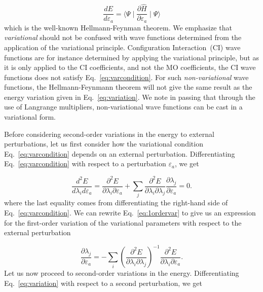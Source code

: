 \documentclass[%
 reprint,
 amsmath,amssymb,
 aps,
]{revtex4-1}
\begin{document}
\begin{equation}
\frac{dE}{d\varepsilon_a} = \langle\Psi\mid\frac{\partial
  \hat{H}}{\partial \varepsilon_a}\mid\Psi\rangle
\end{equation}
which is the well-known Hellmann-Feynman theorem. We emphasize that {\em
variational\/} should not be confused with wave functions determined from the
application of the variational principle. Configuration Interaction~(CI) wave
functions are for instance determined by applying the variational principle,
but as it is only applied to the CI coefficients, and not the MO coefficients,
the CI wave functions does not satisfy Eq.~\eqref{eq:varcondition}. For such
{\em non-variational} wave functions, the Hellmann-Feynmann theorem will not
give the same result as the energy variation given in Eq.~\eqref{eq:variation}.
We note in passing that through the use of Langrange multipliers,
non-variational wave functions can be cast in a variational
form.~\cite{HelgakerJorgensen,PRSBook}

Before considering second-order variations in the energy to external
perturbations, let us first consider how the variational condition
Eq.~\eqref{eq:varcondition} depends on an external perturbation.
Differentiating Eq.~\eqref{eq:varcondition} with respect to a perturbation
$\varepsilon_a$, we get

\begin{equation}
\frac{d^2E}{d\lambda_id\varepsilon_a} =
\frac{\partial^2E}{\partial\lambda_i\partial\varepsilon_a} +
\sum_j\frac{\partial^2E}{\partial\lambda_i\partial\lambda_j}\frac{\partial\lambda_j}{\partial\varepsilon_a}
= 0.\label{eq:1ordervar}
\end{equation}
where the last equality comes from differentiating the right-hand side of
Eq.~\eqref{eq:varcondition}. We can rewrite Eq.~\eqref{eq:1ordervar} to give us
an expression for the first-order variation of the variational parameters with
respect to the external perturbation

\begin{equation}
\frac{\partial\lambda_j}{\partial\varepsilon_a} =
-\sum_i\left(\frac{\partial^2E}{\partial\lambda_i\partial\lambda_j}\right)^{-1}\frac{\partial^2E}{\partial\lambda_i\partial\varepsilon_a}.
\end{equation}
Let us now proceed to second-order variations in the energy. Differentiating
Eq.~\eqref{eq:variation} with respect to a second perturbation, we get
\end{document}
